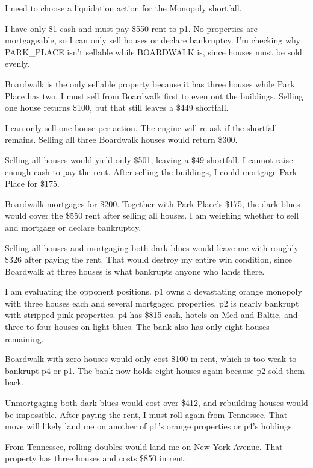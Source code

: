 {\small I need to choose a liquidation action for the Monopoly shortfall.
\par
I have only \$1 cash and must pay \$550 rent to p1. No properties are mortgageable, so I can only sell houses or declare bankruptcy. I'm checking why PARK\_PLACE isn't sellable while BOARDWALK is, since houses must be sold evenly.
\par
Boardwalk is the only sellable property because it has three houses while Park Place has two. I must sell from Boardwalk first to even out the buildings. Selling one house returns \$100, but that still leaves a \$449 shortfall.
\par
I can only sell one house per action. The engine will re-ask if the shortfall remains. Selling all three Boardwalk houses would return \$300.
\par
Selling all houses would yield only \$501, leaving a \$49 shortfall. I cannot raise enough cash to pay the rent. After selling the buildings, I could mortgage Park Place for \$175.
\par
Boardwalk mortgages for \$200. Together with Park Place's \$175, the dark blues would cover the \$550 rent after selling all houses. I am weighing whether to sell and mortgage or declare bankruptcy.
\par
Selling all houses and mortgaging both dark blues would leave me with roughly \$326 after paying the rent. That would destroy my entire win condition, since Boardwalk at three houses is what bankrupts anyone who lands there.
\par
I am evaluating the opponent positions. p1 owns a devastating orange monopoly with three houses each and several mortgaged properties. p2 is nearly bankrupt with stripped pink properties. p4 has \$815 cash, hotels on Med and Baltic, and three to four houses on light blues. The bank also has only eight houses remaining.
\par
Boardwalk with zero houses would only cost \$100 in rent, which is too weak to bankrupt p4 or p1. The bank now holds eight houses again because p2 sold them back.
\par
Unmortgaging both dark blues would cost over \$412, and rebuilding houses would be impossible. After paying the rent, I must roll again from Tennessee. That move will likely land me on another of p1's orange properties or p4's holdings.
\par
From Tennessee, rolling doubles would land me on New York Avenue. That property has three houses and costs \$850 in rent.
\par
}
